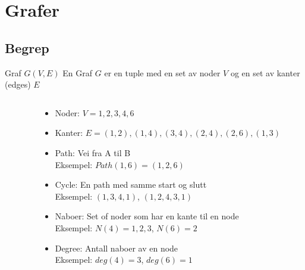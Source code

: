\section{Grafer}
\subsection*{Begrep}
\begin{frame}
    \begin{block}{Graf $G(V,E)$}
    En Graf $G$ er en tuple med en set av noder $V$ og en set av kanter (edges) $E$
    \end{block}
    \pause

\begin{columns}
    \begin{column}{0.28\textwidth}
 \end{column}
 \pause
    \begin{column}{0.68\textwidth}
\begin{itemize}[<+->]
    \item Noder: $V={1,2,3,4,6}$
    \item Kanter: $E={(1,2), (1,4), (3,4), (2,4), (2,6), (1,3)}$
    \item Path: Vei fra A til B\\
    Eksempel: $Path(1,6)=(1,2,6)$
    \item Cycle: En path med samme start og slutt\\
    Eksempel: $(1,3,4,1)$, $(1,2,4,3,1)$
    \item Naboer: Set of noder som har en kante til en node\\
    Eksempel: $N(4)={1,2,3}$, $N(6)=2$
    \item Degree: Antall naboer av en node\\
    Eksempel: $deg(4)=3$, $deg(6)=1$
\end{itemize}
 \end{column}
\end{columns}
\end{frame}

